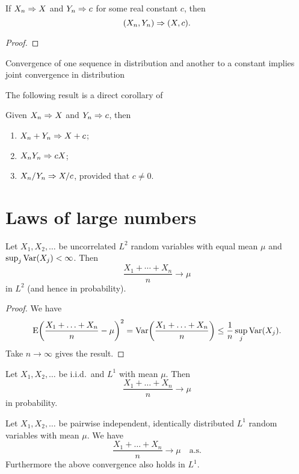 \begin{lem}
    If $X_n \Rightarrow X$ and $Y_n \Rightarrow c$ for some real constant $c$, then \[
        (X_n,Y_n) \Rightarrow (X,c).
    \]
\end{lem}
\begin{proof}
    
\end{proof}

Convergence of one sequence in distribution and another to a constant implies joint convergence in distribution

The following result is a direct corollary of 

\begin{namedthm}
    Given $X_n \Rightarrow X$ and $Y_n \Rightarrow c$, then \begin{enumerate}
        \item $X_n + Y_n \Rightarrow X + c$;
        \item $X_nY_n\Rightarrow cX$;
        \item $X_n/Y_n \Rightarrow X/c$, provided that $c \neq 0$.
    \end{enumerate}
\end{namedthm}



\section{Laws of large numbers}
\begin{namedthm}
    Let $X_1,X_2,\dotsc$ be uncorrelated $L^2$ random variables with equal mean $\mu$ and $\sup_j\operatorname{Var}(X_j) < \infty$. Then \[
        \frac{X_1 + \dotsb + X_n}{n} \to \mu 
    \] in $L^2$ (and hence in probability).
\end{namedthm}
\begin{proof}
    We have \[
        \mathop{}\!\mathrm{E} \biggl(\frac{X_1+\dotsc+X_n}{n} - \mu\biggr)^2 = \operatorname{Var}\biggl(\frac{X_1+\dotsc+X_n}{n}\biggr) \leq \frac{1}{n} \sup_j \operatorname{Var}(X_j).
    \] Take $n \to \infty$ gives the result.
\end{proof}

\begin{namedthm}
    Let $X_1,X_2,\dotsc$ be i.i.d.\ and $L^1$ with mean $\mu$. Then \[
        \frac{X_1 + \dotsc + X_n}{n} \to \mu
    \] in probability.
\end{namedthm}

\begin{namedthm} \label{thm:SLLN}
    Let $X_1,X_2,\dotsc$ be pairwise independent, identically distributed $L^1$ random variables with mean $\mu$. We have \[
        \frac{X_1 + \dotsc + X_n}{n} \to \mu \quad \text{a.s.}
    \]
    Furthermore the above convergence also holds in $L^1$.
\end{namedthm}

